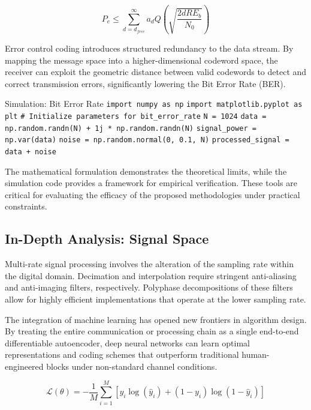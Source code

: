 \begin{equation}
    P_e \leq \sum_{d=d_{free}}^{\infty} a_d Q\left(\sqrt{\frac{2 d R E_b}{N_0}}\right)
\end{equation}

Error control coding introduces structured redundancy to the data stream. By mapping the message space into a higher-dimensional codeword space, the receiver can exploit the geometric distance between valid codewords to detect and correct transmission errors, significantly lowering the Bit Error Rate (BER).

\begin{pythonbox}{Simulation: Bit Error Rate}
\texttt{import numpy as np}
\texttt{import matplotlib.pyplot as plt}
\texttt{}
\texttt{\# Initialize parameters for bit\_error\_rate}
\texttt{N = 1024}
\texttt{data = np.random.randn(N) + 1j * np.random.randn(N)}
\texttt{signal\_power = np.var(data)}
\texttt{noise = np.random.normal(0, 0.1, N)}
\texttt{processed\_signal = data + noise}
\end{pythonbox}

\vspace{0.5cm}
The mathematical formulation demonstrates the theoretical limits, while the simulation code provides a framework for empirical verification. These tools are critical for evaluating the efficacy of the proposed methodologies under practical constraints.


\subsection{In-Depth Analysis: Signal Space}
Multi-rate signal processing involves the alteration of the sampling rate within the digital domain. Decimation and interpolation require stringent anti-aliasing and anti-imaging filters, respectively. Polyphase decompositions of these filters allow for highly efficient implementations that operate at the lower sampling rate.

The integration of machine learning has opened new frontiers in algorithm design. By treating the entire communication or processing chain as a single end-to-end differentiable autoencoder, deep neural networks can learn optimal representations and coding schemes that outperform traditional human-engineered blocks under non-standard channel conditions.

\begin{equation}
    \mathcal{L}(\theta) = -\frac{1}{M} \sum_{i=1}^{M} \left[ y_i \log(\hat{y}_i) + (1-y_i)\log(1-\hat{y}_i) \right]
\end{equation}

